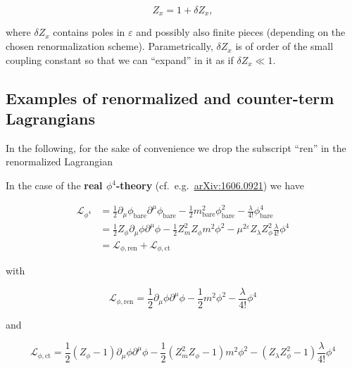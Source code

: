 \documentclass[../FeynCalcManual.tex]{subfiles}
\begin{document}
\begin{equation}
Z_x = 1 + \delta Z_x,
\end{equation}

where \(\delta Z_x\) contains poles in \(\varepsilon\) and possibly also
finite pieces (depending on the chosen renormalization scheme).
Parametrically, \(\delta Z_x\) is of order of the small coupling
constant so that we can ``expand'' in it as if \(\delta Z_x \ll 1\).

\hypertarget{examples-of-renormalized-and-counter-term-lagrangians}{%
\subsection{Examples of renormalized and counter-term
Lagrangians}\label{examples-of-renormalized-and-counter-term-lagrangians}}

In the following, for the sake of convenience we drop the subscript
``ren'' in the renormalized Lagrangian

In the case of the \textbf{real \(\phi^4\)-theory}
(cf.~e.g.~\href{https://arxiv.org/pdf/1606.09210.pdf}{arXiv:1606.0921})
we have

\begin{align*}
\mathcal{L}_{\phi^4} &= \frac{1}{2} \partial_\mu \phi_{\textrm{bare}} \partial^\mu \phi_{\textrm{bare}} - \frac{1}{2} m_{\textrm{bare}}^2 \phi_{\textrm{bare}}^2 - \frac{\lambda}{4!} \phi_{\textrm{bare}}^4 \\
& = \frac{1}{2} Z_\phi \partial_\mu \phi \partial^\mu \phi - \frac{1}{2} Z_m^2 Z_\phi m^2 \phi^2 - \mu^{2 \varepsilon} Z_\lambda Z_\phi^2 \frac{\lambda}{4!} \phi^4 \\
 & = \mathcal{L}_{\phi,\textrm{ren}} + \mathcal{L}_{\phi,\textrm{ct}}
\end{align*}

with

\begin{equation}
\mathcal{L}_{\phi,{\textrm{ren}}} = \frac{1}{2} \partial_\mu \phi \partial^\mu \phi - \frac{1}{2} m^2 \phi^2 - \frac{\lambda}{4!} \phi^4
\end{equation}

and

\begin{equation}
\mathcal{L}_{\phi,{\textrm{ct}}} = \frac{1}{2} (Z_\phi - 1) \partial_\mu \phi \partial^\mu \phi - \frac{1}{2} (Z_m^2 Z_\phi - 1) m^2 \phi^2 - (Z_\lambda Z_\phi^2 - 1) \frac{\lambda}{4!} \phi^4
\end{equation}
\end{document}
